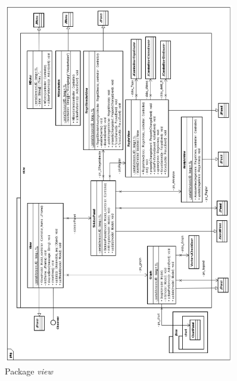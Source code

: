\begin{figure}[p]
\centering
\includegraphics[width=0.9\textwidth]{packview.png}
\caption{Package \textit{view}}
\label{packview}
\end{figure}

\newpage
